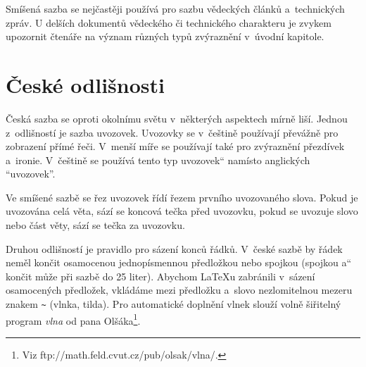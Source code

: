 \documentclass[a4paper,11pt,twocolumn]{article}[24. 2. 2016]
\newcommand{\myuv}[1]{\quotedblbase #1\textquotedblleft}
\begin{document}
Smíšená sazba se nejčastěji používá pro sazbu vě\-dec\-kých článků a~technických zpráv. U delších do\-ku\-men\-tů vědeckého či technického charakteru je zvykem upozornit čtenáře na význam různých typů zvýraznění v~úvodní kapitole.

\section{České odlišnosti}

Česká sazba se oproti okolnímu světu v~některých aspektech mírně liší. Jednou z~odlišností je sazba uvo\-zo\-vek. Uvozovky se v~češtině používají převážně pro zobrazení přímé řeči. V~menší míře se používají také pro zvýraznění přezdívek a~ironie. V~češtině se používá tento \myuv{typ uvozovek} namísto anglických ``uvozovek''.

Ve smíšené sazbě se řez uvozovek řídí řezem prvního uvozovaného slova. Pokud je uvozována celá věta, sází se koncová tečka před uvozovku, pokud se uvozuje slovo nebo část věty, sází se tečka za uvozovku.

Druhou odlišností je pravidlo pro sázení konců řádků. V~české sazbě by řádek neměl končit osamocenou jednopísmennou předložkou nebo spoj\-kou (spojkou \myuv{a} končit může při sazbě do 25 liter). Abychom \LaTeX u zabránili v~sázení osamocených předložek, vkládáme mezi předložku a~slovo nezlomitelnou me\-ze\-ru znakem \verb|~| (vlnka, tilda). Pro automatické do\-pl\-ně\-ní vlnek slouží volně šiřitelný program \textit{vlna} od pana Olšáka\footnote{Viz ftp://math.feld.cvut.cz/pub/olsak/vlna/.}.
\end{document}
